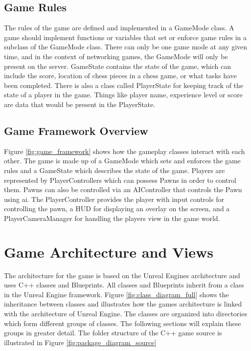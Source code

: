 \subsection{Game Rules}
The rules of the game are defined and implemented in a GameMode class. A game should implement functions or variables that set or enforce game rules in a subclass of the GameMode class. There can only be one game mode at any given time, and in the context of networking games, the GameMode will only be present on the server. GameState contains the state of the game, which can include the score, location of chess pieces in a chess game, or what tasks have been completed. There is also a class called PlayerState for keeping track of the state of a player in the game. Things like player name, experience level or score are data that would be present in the PlayerState.

\subsection{Game Framework Overview}
Figure \ref{fig:game_framework} shows how the gameplay classes interact with each other. The game is made up of a GameMode which sets and enforces the game rules and a GameState which describes the state of the game. Players are represented by PlayerControllers which can possess Pawns in order to control them. Pawns can also be controlled via an AIController that controls the Pawn using \gls{ai}. The PlayerController provides the player with input controls for controlling the pawn, a HUD for displaying an overlay on the screen, and a PlayerCameraManager for handling the players view in the game world.



\section{Game Architecture and Views}
The architecture for the game is based on the Unreal Engines architecture and uses C++ classes and Blueprints. All classes and Blueprints inherit from a class in the Unreal Engine framework. Figure \ref{fig:class_diagram_full} shows the inheritance between classes and illustrates how the games architecture is linked with the architecture of Unreal Engine. The classes are organized into directories which form different groups of classes. The following sections will explain these groups in greater detail. The folder structure of the C++ game source is illustrated in Figure \ref{fig:package_diagram_source}


